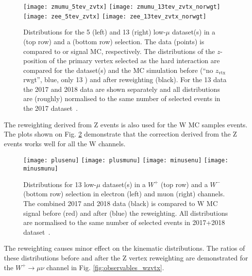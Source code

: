 \begin{figure}[tph]
	\centering
	\texttt{[image: zmumu\_5tev\_zvtx]}%
	\texttt{[image: zmumu\_13tev\_zvtx\_norwgt]}
	\texttt{[image: zee\_5tev\_zvtx]}%
	\texttt{[image: zee\_13tev\_zvtx\_norwgt]}
	\caption{Distributions for the 5 \TeV{} (left) and 13 \TeV{} (right)
		low-$\mu$ dataset(s) in a \Zgmm (top row) and a \Zgee (bottom row)
		selection. The data (points) is compared to \Zgmm or \Zgee signal
		MC, respectively. The distributions of the $z$-position of the
		primary vertex selected as the hard interaction are compared for
		the dataset(s) and the MC simulation before (``no $z_\mathrm{vtx}$
		rwgt'', blue, only 13 \TeV{}) and after reweighting (black). For
		the 13 \TeV{} data the 2017 and 2018 data are shown separately and
		all distributions are (roughly) normalised to the same number of
		selected events in the 2017 dataset~\cite{int_note_samples}.}
	\label{fig:zvtx}
\end{figure}

The reweighting derived from Z events is also used for the W MC samples events. The plots shown on Fig. \ref{fig:wzvtx} demonstrate that the correction derived from the Z events works well for all the W channels.  
\begin{figure}[tph]
	\centering
	\texttt{[image: plusenu]}%
	\texttt{[image: plusmunu]}
	\texttt{[image: minusenu]}%
	\texttt{[image: minusmunu]}
	\caption{Distributions for 13 \TeV{} 
		low-$\mu$ dataset(s) in a $W^{+}$ (top row) and a $W^{-}$ (bottom row)
		selection in electron (left) and muon (right) channels. The combined 2017 and 2018 data (black) is compared to W MC signal before (red) and after (blue) the reweighting.
		All distributions are normalised to the same number of
		selected events in 2017+2018 dataset~\cite{int_note_samples}.}
	\label{fig:wzvtx}
\end{figure}

The reweighting causes minor effect on the kinematic distributions. The ratios of these distributions before and after the Z vertex reweighting are demonstrated for the  $W^{+}\rightarrow \mu\nu$ channel in Fig. \ref{fig:observables_wzvtx}. 

